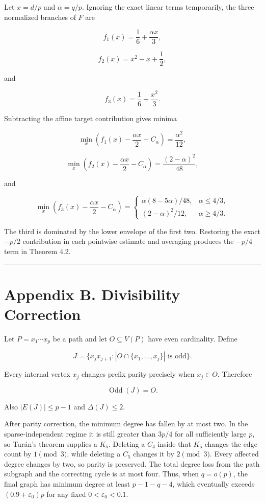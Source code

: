 \documentclass[
  11pt,
]{article}
\begin{document}
Let \(x=d/p\) and \(\alpha=q/p\). Ignoring the exact linear terms
temporarily, the three normalized branches of \(F\) are

\[
f_1(x)=\frac16+\frac{\alpha x}{3},
\]

\[
f_2(x)=x^2-x+\frac12,
\]

and

\[
f_3(x)=\frac16+\frac{x^2}{3}.
\]

Subtracting the affine target contribution gives minima

\[
\min_x\left(f_1(x)-\frac{\alpha x}{2}-C_\alpha\right)
=
\frac{\alpha^2}{12},
\]

\[
\min_x\left(f_2(x)-\frac{\alpha x}{2}-C_\alpha\right)
=
\frac{(2-\alpha)^2}{48},
\]

and

\[
\min_x\left(f_3(x)-\frac{\alpha x}{2}-C_\alpha\right)
=
\begin{cases}
\alpha(8-5\alpha)/48,&\alpha\le4/3,\\
(2-\alpha)^2/12,&\alpha\ge4/3.
\end{cases}
\]

The third is dominated by the lower envelope of the first two. Restoring
the exact \(-p/2\) contribution in each pointwise estimate and averaging
produces the \(-p/4\) term in Theorem 4.2.

\begin{center}\rule{0.5\linewidth}{0.5pt}\end{center}

\section{Appendix B. Divisibility
Correction}\label{appendix-b.-divisibility-correction}

Let \(P=x_1\cdots x_p\) be a path and let \(O\subseteq V(P)\) have even
cardinality. Define

\[
J=\{x_jx_{j+1}:|O\cap\{x_1,\ldots,x_j\}|\text{ is odd}\}.
\]

Every internal vertex \(x_j\) changes prefix parity precisely when
\(x_j\in O\). Therefore

\[
\operatorname{Odd}(J)=O.
\]

Also \(|E(J)|\le p-1\) and \(\Delta(J)\le2\).

After parity correction, the minimum degree has fallen by at most two.
In the sparse-independent regime it is still greater than \(3p/4\) for
all sufficiently large \(p\), so Turán's theorem supplies a \(K_5\).
Deleting a \(C_4\) inside that \(K_5\) changes the edge count by
\(1\pmod3\), while deleting a \(C_5\) changes it by \(2\pmod3\). Every
affected degree changes by two, so parity is preserved. The total degree
loss from the path subgraph and the correcting cycle is at most four.
Thus, when \(q=o(p)\), the final graph has minimum degree at least
\(p-1-q-4\), which eventually exceeds \((0.9+\varepsilon_0)p\) for any
fixed \(0<\varepsilon_0<0.1\).
\end{document}
